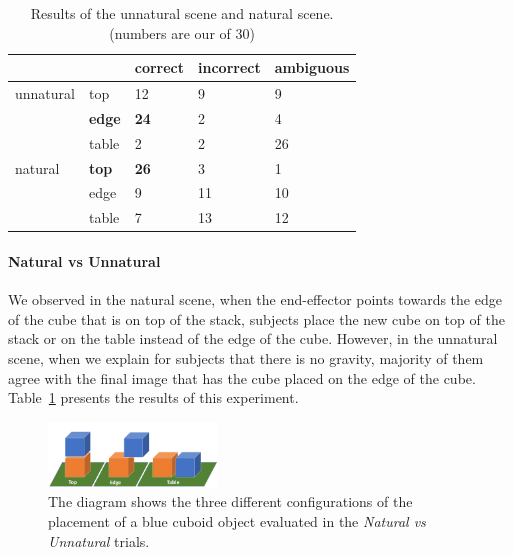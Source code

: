 \begin{table}[H]
\label{tab:naturaltrial}
\begin{tabular}{lllll}
          &               & correct     & incorrect & ambiguous \\ \hline
unnatural & top           & 12          & 9         & 9         \\
          & \textbf{edge} & \textbf{24} & 2         & 4         \\
          & table         & 2           & 2         & 26        \\ \hline
natural   & \textbf{top}  & \textbf{26} & 3         & 1         \\
          & edge          & 9           & 11        & 10        \\
          & table         & 7           & 13        & 12        \\ \hline
\end{tabular}
\caption{Results of the unnatural scene and natural scene. (numbers are our of 30) }
\label{tab:natural-unnatural}
\end{table}


\paragraph{Natural vs Unnatural}

We observed in the natural scene, when the end-effector points towards the edge of the cube that is on top of the stack, subjects place the new cube on top of the stack or on the table instead of the edge of the cube. However, in the unnatural scene, when we explain for subjects that there is no gravity, majority of them agree with the final image that has the cube placed on the edge of the cube. Table~\ref{tab:natural-unnatural} presents the results of this experiment. 

\begin{figure}[H]
    \centering
    \includegraphics[width=0.4\textwidth, trim={0 0 0 0.7in},clip ] {figures/topedgetable.png}
    \vspace{-0.1in}
    \caption{
    The diagram shows the three different configurations of the placement of a blue cuboid object evaluated in the \textit{Natural vs Unnatural} trials. 
    }
    \label{fig:topedgetable}
    \vspace{-0.2in}
\end{figure}


